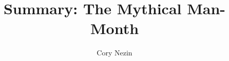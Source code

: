 \documentclass[12pt]{article}
\begin{document}
\title{Summary: The Mythical Man-Month}
\author{Cory Nezin}
\maketitle







\end{document}
